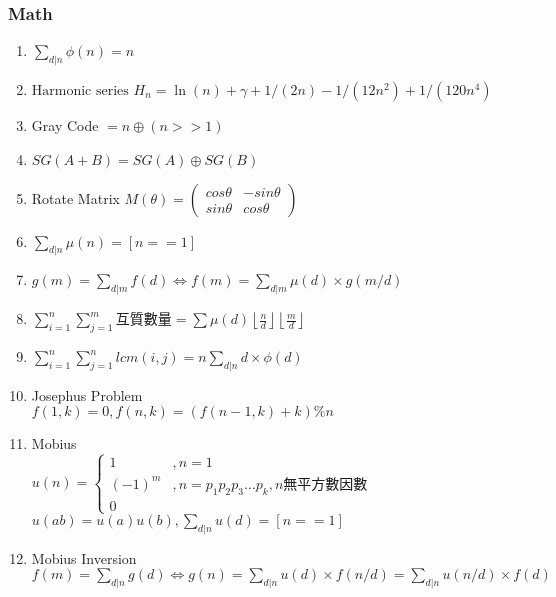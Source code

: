 \subsubsection{Math}
\begin{enumerate}\itemsep = -3pt
\item $\sum_{d|n} \phi(n) = n$
\item $\text{Harmonic series } H_n = \ln(n) + \gamma + 1/(2n) - 1/(12n^2) + 1/(120n^4)$
\item Gray Code $=n\oplus (n>>1)$
\item $SG(A+B)=SG(A)\oplus SG(B)$
\item Rotate Matrix $M(\theta)= \left( \begin{array}{ccc}
cos\theta & -sin\theta \\ 
sin\theta &  cos\theta
\end{array} \right)$
\item $\sum_{d|n} \mu (n)=[n==1]$
\item $g(m)=\sum_{d|m}f(d)\Leftrightarrow f(m)=\sum_{d|m}\mu (d) \times g(m/d)$
\item $\sum_{i=1}^n\sum_{j=1}^m$互質數量$=\sum \mu (d)\left \lfloor \frac{n}{d} \right \rfloor \left \lfloor \frac{m}{d} \right \rfloor$
\item $\sum_{i=1}^n\sum_{j=1}^nlcm(i,j)=n\sum_{d|n} d \times \phi (d)$
\item Josephus Problem\\
$f(1,k) = 0, f(n, k) = (f(n-1,k)+k) \% n$
\item Mobius\\
$u(n) = \begin{cases}
1 &, n = 1\\
(-1)^m &, n = p_1 p_2 p_3 \dots p_k, n \text{無平方數因數}\\
0
\end{cases}$\\
$u(ab) = u(a)u(b), \sum_{d | n} u(d) = [n == 1]$
\item Mobius Inversion\\
$f(m)=\sum_{d|n}g(d)\Leftrightarrow g(n)=\sum_{d|n} u(d) \times f(n/d) = \sum_{d|n} u(n/d) \times f(d) $


\end{enumerate}
